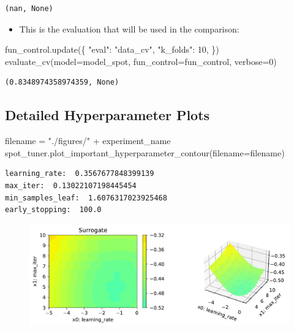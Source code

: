 \documentclass[
  letterpaper,
  DIV=11,
  numbers=noendperiod]{scrreprt}
\newenvironment{Shaded}{\begin{snugshade}}{\end{snugshade}}
\newcommand{\DecValTok}[1]{\textcolor[rgb]{0.68,0.00,0.00}{#1}}
\newcommand{\NormalTok}[1]{\textcolor[rgb]{0.00,0.23,0.31}{#1}}
\newcommand{\OperatorTok}[1]{\textcolor[rgb]{0.37,0.37,0.37}{#1}}
\newcommand{\StringTok}[1]{\textcolor[rgb]{0.13,0.47,0.30}{#1}}
\providecommand{\tightlist}{%
  \setlength{\itemsep}{0pt}\setlength{\parskip}{0pt}}\usepackage{longtable,booktabs,array}
\begin{document}
\begin{verbatim}
(nan, None)
\end{verbatim}

\begin{itemize}
\tightlist
\item
  This is the evaluation that will be used in the comparison:
\end{itemize}

\begin{Shaded}
\begin{Highlighting}[]
\NormalTok{fun\_control.update(\{}
     \StringTok{"eval"}\NormalTok{: }\StringTok{"data\_cv"}\NormalTok{,}
     \StringTok{"k\_folds"}\NormalTok{: }\DecValTok{10}\NormalTok{,}
\NormalTok{\})}
\NormalTok{evaluate\_cv(model}\OperatorTok{=}\NormalTok{model\_spot, fun\_control}\OperatorTok{=}\NormalTok{fun\_control, verbose}\OperatorTok{=}\DecValTok{0}\NormalTok{)}
\end{Highlighting}
\end{Shaded}

\begin{verbatim}
(0.8348974358974359, None)
\end{verbatim}

\hypertarget{detailed-hyperparameter-plots-4}{%
\subsection{Detailed Hyperparameter
Plots}\label{detailed-hyperparameter-plots-4}}

\begin{Shaded}
\begin{Highlighting}[]
\NormalTok{filename }\OperatorTok{=} \StringTok{"./figures/"} \OperatorTok{+}\NormalTok{ experiment\_name}
\NormalTok{spot\_tuner.plot\_important\_hyperparameter\_contour(filename}\OperatorTok{=}\NormalTok{filename)}
\end{Highlighting}
\end{Shaded}

\begin{verbatim}
learning_rate:  0.3567677848399139
max_iter:  0.13022107198445454
min_samples_leaf:  1.6076317023925468
early_stopping:  100.0
\end{verbatim}

\begin{figure}[H]

{\centering \includegraphics{17_spot_hpt_sklearn_multiclass_classification_xgb_files/figure-pdf/cell-46-output-2.pdf}

}

\end{figure}
\end{document}
